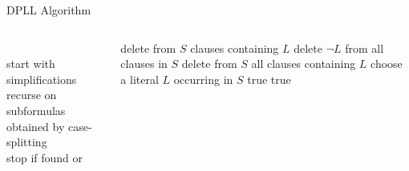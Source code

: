 \documentclass[t]{sdqbeamer}
\begin{document}
\begin{frame}{DPLL Algorithm}
\begin{block}{}
\begin{columns}[T]
\begin{column}{.2\linewidth}
~\\[1em]
start with simplifications\\[1em]
recurse on subformulas obtained by case-splitting\\[1em]
stop if  found or 
\end{column}
\begin{column}{.7\linewidth}
\begin{algorithm}[H]
\DontPrintSemicolon
\caption{DPLL(ClauseSet $S$)}
	 {
		delete from $S$ clauses containing $L$ 
		delete $\lnot L$ from all clauses in $S$ 
	}
	 { 
		\Return {}  
	}
	 {
		delete from $S$ all clauses containing $L$ 
	}
	 { 
		\Return {}  
	}
	choose a literal $L$ occurring in $S$ 
	 { 
		\Return true  
	}
	 { 
		\Return true  
	}
\end{algorithm}
\end{column}
\end{columns}
\end{block}
\end{frame}
\end{document}
